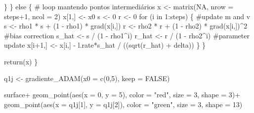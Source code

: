 \documentclass[
  a4paperpaper,
]{article}
\newenvironment{Shaded}{\begin{snugshade}}{\end{snugshade}}
\newcommand{\AttributeTok}[1]{\textcolor[rgb]{0.40,0.45,0.13}{#1}}
\newcommand{\CommentTok}[1]{\textcolor[rgb]{0.37,0.37,0.37}{#1}}
\newcommand{\ConstantTok}[1]{\textcolor[rgb]{0.56,0.35,0.01}{#1}}
\newcommand{\ControlFlowTok}[1]{\textcolor[rgb]{0.00,0.23,0.31}{#1}}
\newcommand{\DecValTok}[1]{\textcolor[rgb]{0.68,0.00,0.00}{#1}}
\newcommand{\FunctionTok}[1]{\textcolor[rgb]{0.28,0.35,0.67}{#1}}
\newcommand{\NormalTok}[1]{\textcolor[rgb]{0.00,0.23,0.31}{#1}}
\newcommand{\OtherTok}[1]{\textcolor[rgb]{0.00,0.23,0.31}{#1}}
\newcommand{\SpecialCharTok}[1]{\textcolor[rgb]{0.37,0.37,0.37}{#1}}
\newcommand{\StringTok}[1]{\textcolor[rgb]{0.13,0.47,0.30}{#1}}
\begin{document}
\begin{Shaded}
\begin{Highlighting}[]
\NormalTok{    \}}
\NormalTok{  \} }\ControlFlowTok{else}\NormalTok{ \{}
    \CommentTok{\# loop mantendo pontos intermediários}
\NormalTok{    x }\OtherTok{\textless{}{-}} \FunctionTok{matrix}\NormalTok{(}\ConstantTok{NA}\NormalTok{, }\AttributeTok{nrow =}\NormalTok{ steps}\SpecialCharTok{+}\DecValTok{1}\NormalTok{, }\AttributeTok{ncol =} \DecValTok{2}\NormalTok{)}
\NormalTok{    x[}\DecValTok{1}\NormalTok{,] }\OtherTok{\textless{}{-}}\NormalTok{ x0}
\NormalTok{    s }\OtherTok{\textless{}{-}} \DecValTok{0}
\NormalTok{    r }\OtherTok{\textless{}{-}} \DecValTok{0}
    \ControlFlowTok{for}\NormalTok{ (i }\ControlFlowTok{in} \DecValTok{1}\SpecialCharTok{:}\NormalTok{steps) \{}
      \CommentTok{\#update m and v}
\NormalTok{      s }\OtherTok{\textless{}{-}}\NormalTok{ rho1 }\SpecialCharTok{*}\NormalTok{ s }\SpecialCharTok{+}\NormalTok{ (}\DecValTok{1} \SpecialCharTok{{-}}\NormalTok{ rho1) }\SpecialCharTok{*} \FunctionTok{grad}\NormalTok{(x[i,])}
\NormalTok{      r }\OtherTok{\textless{}{-}}\NormalTok{ rho2 }\SpecialCharTok{*}\NormalTok{ r }\SpecialCharTok{+}\NormalTok{ (}\DecValTok{1} \SpecialCharTok{{-}}\NormalTok{ rho2) }\SpecialCharTok{*} \FunctionTok{grad}\NormalTok{(x[i,])}\SpecialCharTok{\^{}}\DecValTok{2}
      \CommentTok{\#bias correction}
\NormalTok{      s\_hat }\OtherTok{\textless{}{-}}\NormalTok{ s }\SpecialCharTok{/}\NormalTok{ (}\DecValTok{1} \SpecialCharTok{{-}}\NormalTok{ rho1}\SpecialCharTok{\^{}}\NormalTok{i)}
\NormalTok{      r\_hat }\OtherTok{\textless{}{-}}\NormalTok{ r }\SpecialCharTok{/}\NormalTok{ (}\DecValTok{1} \SpecialCharTok{{-}}\NormalTok{ rho2}\SpecialCharTok{\^{}}\NormalTok{i)}
      \CommentTok{\#parameter update}
\NormalTok{      x[i}\SpecialCharTok{+}\DecValTok{1}\NormalTok{,] }\OtherTok{\textless{}{-}}\NormalTok{ x[i,] }\SpecialCharTok{{-}}\NormalTok{ l.rate}\SpecialCharTok{*}\NormalTok{s\_hat }\SpecialCharTok{/}\NormalTok{ ((}\FunctionTok{sqrt}\NormalTok{(r\_hat) }\SpecialCharTok{+}\NormalTok{ delta))}
\NormalTok{    \}}
\NormalTok{  \}}
  
  \FunctionTok{return}\NormalTok{(x)}
\NormalTok{\}}

\NormalTok{q1j }\OtherTok{\textless{}{-}} \FunctionTok{gradiente\_ADAM}\NormalTok{(}\AttributeTok{x0 =} \FunctionTok{c}\NormalTok{(}\DecValTok{0}\NormalTok{,}\DecValTok{5}\NormalTok{), }\AttributeTok{keep =} \ConstantTok{FALSE}\NormalTok{)}

\NormalTok{surface}\SpecialCharTok{+}
  \FunctionTok{geom\_point}\NormalTok{(}\FunctionTok{aes}\NormalTok{(}\AttributeTok{x =} \DecValTok{0}\NormalTok{, }\AttributeTok{y =} \DecValTok{5}\NormalTok{), }\AttributeTok{color =} \StringTok{"red"}\NormalTok{, }\AttributeTok{size =} \DecValTok{3}\NormalTok{, }\AttributeTok{shape =} \DecValTok{3}\NormalTok{)}\SpecialCharTok{+}
  \FunctionTok{geom\_point}\NormalTok{(}\FunctionTok{aes}\NormalTok{(}\AttributeTok{x =}\NormalTok{ q1j[}\DecValTok{1}\NormalTok{], }\AttributeTok{y =}\NormalTok{ q1j[}\DecValTok{2}\NormalTok{]), }\AttributeTok{color =} \StringTok{"green"}\NormalTok{, }\AttributeTok{size =} \DecValTok{3}\NormalTok{, }\AttributeTok{shape =} \DecValTok{13}\NormalTok{)}
\end{Highlighting}
\end{Shaded}
\end{document}

